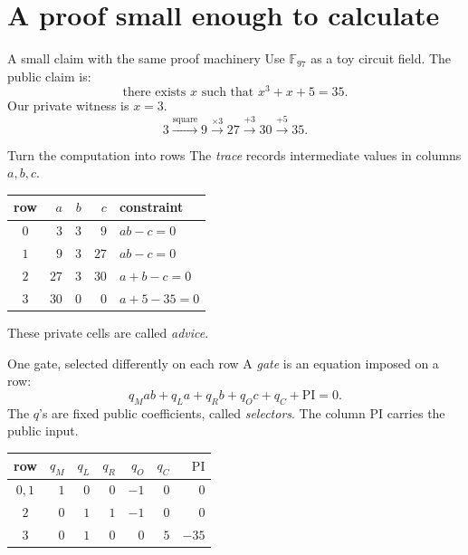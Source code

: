 \documentclass[aspectratio=169,14pt]{beamer}
\newcommand{\F}{\mathbb F}
\newcommand{\PI}{\mathrm{PI}}
\begin{document}
\section{A proof small enough to calculate}
\begin{frame}{A small claim with the same proof machinery}
Use $\F_{97}$ as a toy circuit field. The public claim is:
\[
\text{there exists }x\text{ such that }x^3+x+5=35.
\]
Our private witness is $x=3$.
\[
3\xrightarrow{\text{square}}9
 \xrightarrow{\times3}27
 \xrightarrow{+3}30
 \xrightarrow{+5}35.
\]
\end{frame}

\begin{frame}{Turn the computation into rows}
The \emph{trace} records intermediate values in columns $a,b,c$.
\begin{center}
\renewcommand{\arraystretch}{1.35}
\begin{tabular}{@{}crrrl@{}}
\toprule
row & $a$ & $b$ & $c$ & constraint\\
\midrule
$0$ & $3$ & $3$ & $9$ & $ab-c=0$\\
$1$ & $9$ & $3$ & $27$ & $ab-c=0$\\
$2$ & $27$ & $3$ & $30$ & $a+b-c=0$\\
$3$ & $30$ & $0$ & $0$ & $a+5-35=0$\\
\bottomrule
\end{tabular}
\end{center}
These private cells are called \emph{advice}.
\end{frame}

\begin{frame}{One gate, selected differently on each row}
A \emph{gate} is an equation imposed on a row:
\[
q_Mab+q_La+q_Rb+q_Oc+q_C+\PI=0.
\]
The $q$'s are fixed public coefficients, called \emph{selectors}.
The column $\PI$ carries the public input.
\begin{center}
\renewcommand{\arraystretch}{1.2}
\begin{tabular}{@{}crrrrrr@{}}
row & $q_M$ & $q_L$ & $q_R$ & $q_O$ & $q_C$ & $\PI$\\
\midrule
$0,1$ & $1$ & $0$ & $0$ & $-1$ & $0$ & $0$\\
$2$ & $0$ & $1$ & $1$ & $-1$ & $0$ & $0$\\
$3$ & $0$ & $1$ & $0$ & $0$ & $5$ & $-35$
\end{tabular}
\end{center}
\end{frame}
\end{document}
